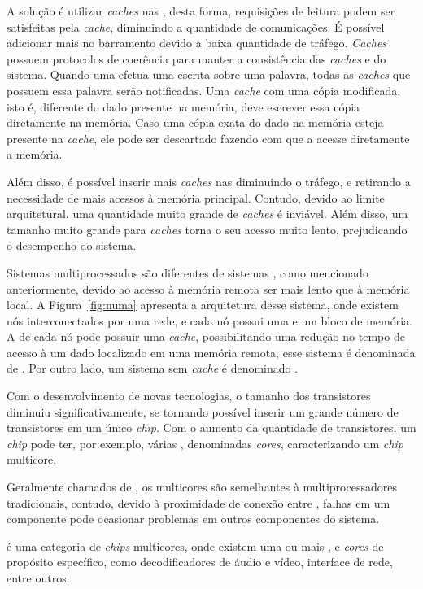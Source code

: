A solução é utilizar \textit{caches} nas \cpus, desta forma, requisições
de leitura podem ser satisfeitas pela \textit{cache}, diminuindo a quantidade de
comunicações. É possível adicionar mais \cpus no barramento devido a baixa
quantidade de tráfego. \textit{Caches} possuem protocolos de coerência para
manter a consistência das \textit{caches} e do sistema. Quando uma \cpu
efetua uma escrita sobre uma palavra, todas as \textit{caches} que possuem essa
palavra serão notificadas. Uma \textit{cache} com uma cópia modificada, isto é,
diferente do dado presente na memória, deve escrever essa cópia diretamente na
memória. Caso uma cópia exata do dado na memória esteja presente na
\textit{cache}, ele pode ser descartado fazendo com que a \cpu acesse
diretamente a memória.

Além disso, é possível inserir mais \textit{caches} nas \cpus
diminuindo o tráfego, e retirando a necessidade de mais acessos à memória
principal. Contudo, devido ao limite arquitetural, uma quantidade muito grande
de \textit{caches} é inviável. Além disso, um tamanho muito grande para
\textit{caches} torna o seu acesso muito lento, prejudicando o desempenho do
sistema.

Sistemas multiprocessados \numa são diferentes de sistemas \uma, como mencionado
anteriormente, devido ao acesso à memória remota ser mais lento que à memória
local. A Figura~\ref{fig:numa} apresenta a arquitetura desse sistema, onde
existem nós interconectados por uma rede, e cada nó possui uma \cpu e um bloco
de memória. A \cpu de cada nó pode possuir uma \textit{cache}, possibilitando
uma redução no tempo de acesso à um dado localizado em uma memória remota, esse
sistema é denominada de \ccnuma. Por outro lado, um sistema sem \textit{cache} é
denominado \ncnuma.

Com o desenvolvimento de novas tecnologias, o tamanho
dos transistores diminuiu significativamente, se tornando possível inserir um
grande número de transistores em um único \textit{chip}.
Com o aumento da quantidade de transistores, um \textit{chip} pode ter, por
exemplo, várias \cpus, denominadas \textit{cores}, caracterizando um
\textit{chip} multicore.

Geralmente chamados de \cmps, os multicores são semelhantes à multiprocessadores
tradicionais, contudo, devido à proximidade de conexão entre \cpus, falhas em um
componente pode ocasionar problemas em outros componentes do sistema.

\soc é uma categoria de \textit{chips} multicores, onde existem uma ou mais
\cpus, e \textit{cores} de propósito específico, como decodificadores de áudio e
vídeo, interface de rede, entre outros.


